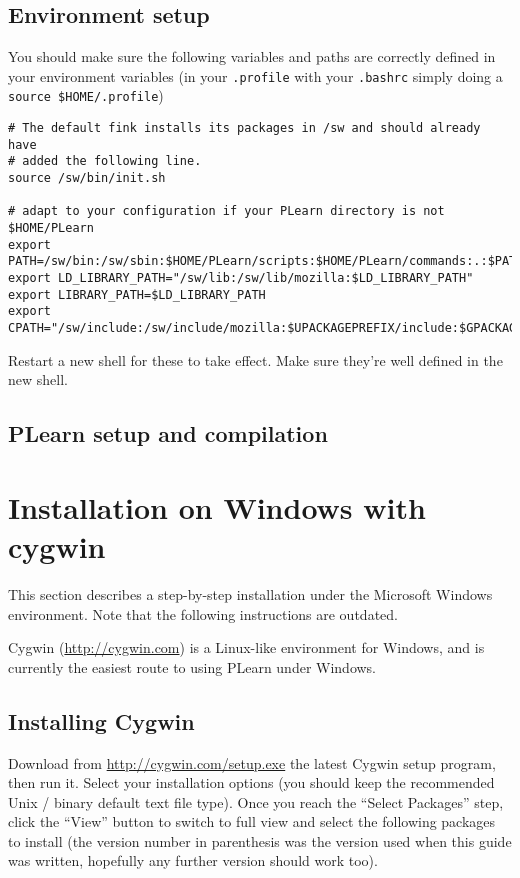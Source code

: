 \documentclass[11pt]{book}
\begin{document}
\subsection{Environment setup}

You should make sure the following variables and paths are correctly defined in your
environment variables (in your {\tt .profile} with your {\tt .bashrc}
simply doing a \verb!source $HOME/.profile!)

\begin{verbatim}
# The default fink installs its packages in /sw and should already have
# added the following line.
source /sw/bin/init.sh

# adapt to your configuration if your PLearn directory is not $HOME/PLearn
export PATH=/sw/bin:/sw/sbin:$HOME/PLearn/scripts:$HOME/PLearn/commands:.:$PATH
export LD_LIBRARY_PATH="/sw/lib:/sw/lib/mozilla:$LD_LIBRARY_PATH"
export LIBRARY_PATH=$LD_LIBRARY_PATH
export CPATH="/sw/include:/sw/include/mozilla:$UPACKAGEPREFIX/include:$GPACKAGEPREFIX/include:$CPATH"
\end{verbatim}

Restart a new shell for these to take effect. Make sure they're well
defined in the new shell.

\subsection{PLearn setup and compilation}


\section{Installation on Windows with cygwin}
\label{sec:windows}

This section describes a step-by-step installation under the Microsoft Windows environment.
Note that the following instructions are outdated.

Cygwin (\url{http://cygwin.com}) is a Linux-like environment for Windows, and is
currently the easiest route to using PLearn under Windows.

\subsection{Installing Cygwin}
Download from \url{http://cygwin.com/setup.exe} the latest Cygwin setup program,
then run it.
Select your installation options (you should keep the recommended Unix / binary default
text file type).
Once you reach the ``Select Packages'' step, click the ``View'' button to switch
to full view and select the following packages to install (the version number in
parenthesis was the version used when this guide was written, hopefully any further
version should work too).
\end{document}
